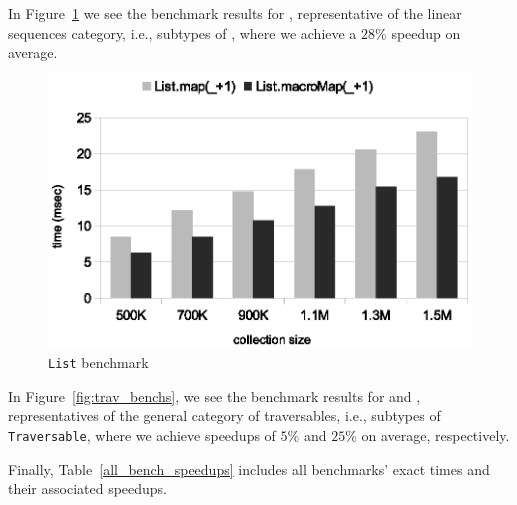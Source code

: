 In Figure~\ref{fig:lin_bench} we see the benchmark results for ,
representative of the linear sequences category, i.e., subtypes of , where we achieve a $28\%$ speedup on average.

\begin{figure}
\centering
\includegraphics[scale=0.7]{figures/list_bench.eps}
\caption[\texttt{List} benchmark]{\texttt{List} benchmark}
\label{fig:lin_bench}
\end{figure}

% 
% 


In Figure~\ref{fig:trav_benchs}, we see the benchmark results for
 and ,
representatives of the general category of traversables, i.e., subtypes of \texttt{Traversable}, where we achieve speedups of $5\%$ and $25\%$ on average, respectively.

Finally, Table~\ref{all_bench_speedups} includes all benchmarks' exact times and their associated speedups.

